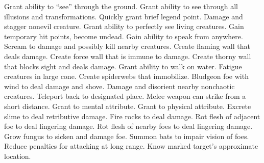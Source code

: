     {Grant ability to ``see'' through the ground.}
    {Grant ability to see through all illusions and transformations.}
    {Quickly grant brief legend point.}
    {Damage and stagger nonevil creature.}
    {Grant ability to perfectly see living creatures.}
    {Gain temporary hit points, become undead.}
    {Gain ability to speak from anywhere.}
    {Scream to damage and possibly kill nearby creatures.}
    {Create flaming wall that deals damage.}
    {Create force wall that is immune to damage.}
    {Create thorny wall that blocks sight and deals damage.}
    {Grant ability to walk on water.}
    {Fatigue creatures in large cone.}
    {Create spiderwebs that immobilize.}
    {Bludgeon foe with wind to deal damage and shove.}
    {Damage and disorient nearby nonchaotic creatures.}
    {Teleport back to designated place.}
    {Melee weapon can strike from a short distance.}
    {Grant  to mental attribute.}
    {Grant  to physical attribute.}
    {Excrete slime to deal retributive damage.}
    {Fire rocks to deal damage.}
    {Rot flesh of adjacent foe to deal lingering damage.}
    {Rot flesh of nearby foes to deal lingering damage.}
    {Grow fungus to sicken and damage foe.}
    {Summon bats to impair vision of foes.}
    {Reduce penalties for attacking at long range.}
    {Know marked target's approximate location.}

